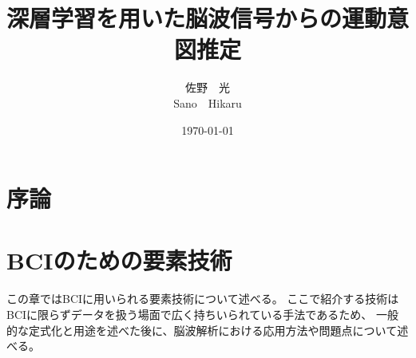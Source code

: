 \documentclass[a4j,11turept, oneside, openany, report]{jsbook}
\title{深層学習を用いた脳波信号からの運動意図推定}
\author{佐野\ \ 光 \\ Sano\ \ Hikaru}
\date{\today}
\begin{document}
%


%
\maketitle
%
%
\frontmatter


% 
\setcounter{tocdepth}{2}
\tableofcontents
%
%
\mainmatter






\chapter{\mc 序論}



\chapter{{\rm BCI}{\mc のための要素技術}}
\label{chapter:BCIのための要素技術}
この章ではBCIに用いられる要素技術について述べる。
ここで紹介する技術はBCIに限らずデータを扱う場面で広く持ちいられている手法であるため、
一般的な定式化と用途を述べた後に、脳波解析における応用方法や問題点について述べる。




\end{document}
